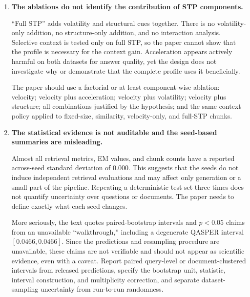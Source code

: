 \documentclass[11pt]{article}
\begin{document}
\begin{enumerate}
  Required controls include matched-chunk-count and matched-index-token baselines, a fixed generator evidence budget, and context baselines such as the immediately preceding units, fixed-window context, random context of equal length, and relevance-selected context without STP. Index size, retrieved tokens, attached tokens, and final prompt tokens should be reported.

  \item \textbf{The ablations do not identify the contribution of STP components.}

  ``Full STP'' adds volatility and structural cues together. There is no volatility-only addition, no structure-only addition, and no interaction analysis. Selective context is tested only on full STP, so the paper cannot show that the profile is necessary for the context gain. Acceleration appears actively harmful on both datasets for answer quality, yet the design does not investigate why or demonstrate that the complete profile uses it beneficially.

  The paper should use a factorial or at least component-wise ablation: velocity; velocity plus acceleration; velocity plus volatility; velocity plus structure; all combinations justified by the hypothesis; and the same context policy applied to fixed-size, similarity, velocity-only, and full-STP chunks.

  \item \textbf{The statistical evidence is not auditable and the seed-based summaries are misleading.}

  Almost all retrieval metrics, EM values, and chunk counts have a reported across-seed standard deviation of 0.000. This suggests that the seeds do not induce independent retrieval evaluations and may affect only generation or a small part of the pipeline. Repeating a deterministic test set three times does not quantify uncertainty over questions or documents. The paper needs to define exactly what each seed changes.

  More seriously, the text quotes paired-bootstrap intervals and $p<0.05$ claims from an unavailable ``walkthrough,'' including a degenerate QASPER interval $[0.0466,0.0466]$. Since the predictions and resampling procedure are unavailable, these claims are not verifiable and should not appear as scientific evidence, even with a caveat. Report paired query-level or document-clustered intervals from released predictions, specify the bootstrap unit, statistic, interval construction, and multiplicity correction, and separate dataset-sampling uncertainty from run-to-run randomness.


\end{enumerate}
\end{document}

